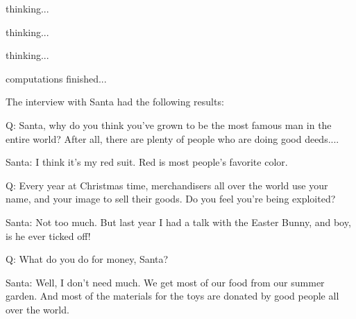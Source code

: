 \documentclass[white]{guildcamp3}
\begin{document}
\name{\wEndWorldThree{}} %

thinking...

thinking...

thinking...

computations finished...

The interview with Santa had the following results:

Q:  Santa, why do you think you've grown to be the most famous man in the
entire world?  After all, there are plenty of people who are doing
good deeds....

Santa:	I think it's my red suit.  Red is most people's favorite color.

Q:  Every year at Christmas time, merchandisers all over the world use your
name, and your image to sell their goods.  Do you feel you're being
exploited?

Santa:	Not too much.  But last year I had a talk with the Easter Bunny, and
boy, is he ever ticked off!

Q:  What do you do for money, Santa?

Santa:	Well, I don't need much.  We get most of our food from our summer
garden.  And most of the materials for the toys are donated by good
people all over the world.
\end{document}
